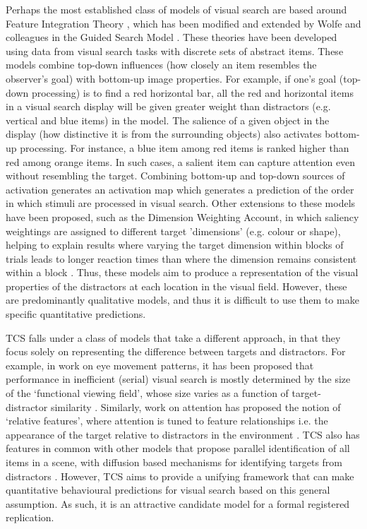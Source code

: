 \documentclass[preprint,12pt,authoryear]{elsarticle}
\begin{document}
Perhaps the most established class of models of visual search are based around Feature Integration Theory \citep{treisman1980feature}, which has been modified and extended by Wolfe and colleagues in the Guided Search Model \citep{wolfe1989guided,wolfe2014approaches}. These theories have been developed using data from visual search tasks with discrete sets of abstract items. These models combine top-down influences (how closely an item resembles the observer's goal) with bottom-up image properties. For example, if one's goal (top-down processing) is to find a red horizontal bar, all the red and horizontal items in a visual search display will be given greater weight than distractors (e.g. vertical and blue items) in the model. The salience of a given object in the display (how distinctive it is from the surrounding objects) also activates bottom-up processing. For instance, a blue item among red items is ranked higher than red among orange items. In such cases, a salient item can capture attention even without resembling the target. Combining bottom-up and top-down sources of activation generates an activation map which generates a prediction of the order in which stimuli are processed in visual search. Other extensions to these models have been proposed, such as the Dimension Weighting Account, in which saliency weightings are assigned to different target 'dimensions' (e.g. colour or shape), helping to explain results where varying the target dimension within blocks of trials leads to longer reaction times than where the dimension remains consistent within a block \citep{krummenacher2012dynamic}. Thus, these models aim to produce a representation of the visual properties of the distractors at each location in the visual field. However, these are predominantly qualitative models, and thus it is difficult to use them to make specific quantitative predictions. 

TCS falls under a class of models that take a different approach, in that they focus solely on representing the difference between targets and distractors. For example, in work on eye movement patterns, it has been proposed that performance in inefficient (serial) visual search is mostly determined by the size of the `functional viewing field', whose size varies as a function of target-distractor similarity \citep{hulleman2017brink}. Similarly, work on attention has proposed the notion of `relative features', where attention is tuned to feature relationships i.e. the appearance of the target relative to distractors in the environment \citep{becker2014color, becker2010role}. TCS also has features in common with other models that propose parallel identification of all items in a scene, with diffusion based mechanisms for identifying targets from distractors \citep{moran2013competitive, moran2016serial}. However, TCS \citep{lleras2020target} aims to provide a unifying framework that can make quantitative behavioural predictions for visual search based on this general assumption. As such, it is an attractive candidate model for a formal registered replication.
\end{document}
